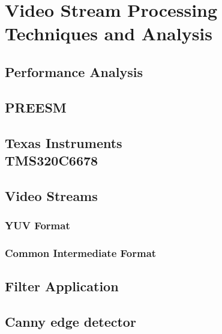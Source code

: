 \chapter{Video Stream Processing Techniques and Analysis}
\label{chapter:experiments}


\section{Performance Analysis}
\label{sec:performance-analysis}


\section{PREESM}
\label{sec:preesm}


\section[Texas Instruments TMS320C6678]{Texas Instruments\\TMS320C6678}
\label{sec:c6678}


\section{Video Streams}
\label{sec:video-streams}

\subsection{YUV Format}
\label{subsec:yuv}

\subsection{Common Intermediate Format}
\label{subsec:cif}

\section{Filter Application}
\label{sec:filterapp}


\section{Canny edge detector}
\label{subsec:canny}


